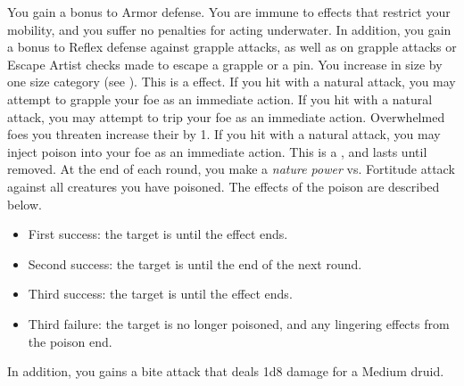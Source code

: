              You gain a  bonus to Armor defense.
             You are immune to effects that restrict your mobility, and you suffer no penalties for acting underwater.
            In addition, you gain a  bonus to Reflex defense against grapple attacks, as well as on grapple attacks or Escape Artist checks made to escape a grapple or a pin.
            You increase in size by one size category (see ).
            This is a  effect.
            If you hit with a natural attack, you may attempt to grapple your foe as an immediate action.
            If you hit with a natural attack, you may attempt to trip your foe as an immediate action.
            Overwhelmed foes you threaten increase their  by 1.
            If you hit with a natural attack, you may inject poison into your foe as an immediate action.
            This is a , and lasts until removed.
            At the end of each round, you make a \textit{nature power} vs. Fortitude attack against all creatures you have poisoned.
            The effects of the poison are described below.
            \begin{itemize}
                \item First success: the target is \sickened until the effect ends.
                \item Second success: the target is \staggered until the end of the next round.
                \item Third success: the target is \nauseated until the effect ends.
                \item Third failure: the target is no longer poisoned, and any lingering effects from the poison end.
            \end{itemize}
            \par In addition, you gains a bite attack that deals 1d8 damage for a Medium druid.

